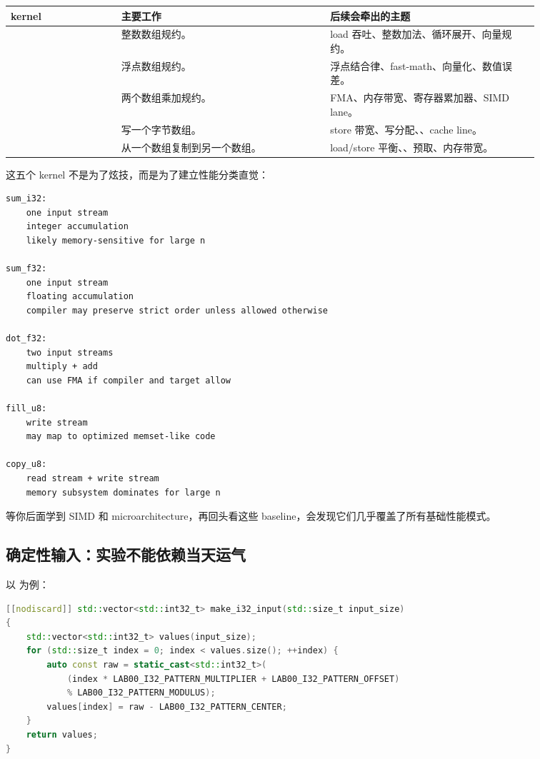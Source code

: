 \begin{center}
\begin{tabular}{L{0.18\linewidth}L{0.34\linewidth}L{0.34\linewidth}}
\toprule
kernel & 主要工作 & 后续会牵出的主题 \\
\midrule
{} & 整数数组规约。 & load 吞吐、整数加法、循环展开、向量规约。 \\
 & 浮点数组规约。 & 浮点结合律、fast-math、向量化、数值误差。 \\
 & 两个数组乘加规约。 & FMA、内存带宽、寄存器累加器、SIMD lane。 \\
 & 写一个字节数组。 & store 带宽、写分配、、cache line。 \\
 & 从一个数组复制到另一个数组。 & load/store 平衡、、预取、内存带宽。 \\
\bottomrule
\end{tabular}
\end{center}

这五个 kernel 不是为了炫技，而是为了建立性能分类直觉：

\begin{lstlisting}
sum_i32:
    one input stream
    integer accumulation
    likely memory-sensitive for large n

sum_f32:
    one input stream
    floating accumulation
    compiler may preserve strict order unless allowed otherwise

dot_f32:
    two input streams
    multiply + add
    can use FMA if compiler and target allow

fill_u8:
    write stream
    may map to optimized memset-like code

copy_u8:
    read stream + write stream
    memory subsystem dominates for large n
\end{lstlisting}

等你后面学到 SIMD 和 microarchitecture，再回头看这些 baseline，会发现它们几乎覆盖了所有基础性能模式。

\subsection{确定性输入：实验不能依赖当天运气}

以  为例：

\begin{lstlisting}[language=C++]
[[nodiscard]] std::vector<std::int32_t> make_i32_input(std::size_t input_size)
{
    std::vector<std::int32_t> values(input_size);
    for (std::size_t index = 0; index < values.size(); ++index) {
        auto const raw = static_cast<std::int32_t>(
            (index * LAB00_I32_PATTERN_MULTIPLIER + LAB00_I32_PATTERN_OFFSET)
            % LAB00_I32_PATTERN_MODULUS);
        values[index] = raw - LAB00_I32_PATTERN_CENTER;
    }
    return values;
}
\end{lstlisting}

